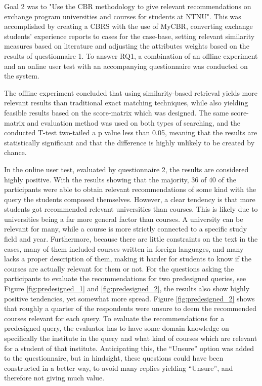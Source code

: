 Goal 2 was to "Use the CBR methodology to give relevant recommendations on exchange program universities and courses for students at NTNU". This was accomplished by creating a CBRS with the use of MyCBR, converting exchange students' experience reports to cases for the case-base, setting relevant similarity measures based on literature and adjusting the attributes weights based on the results of questionnaire 1. To answer RQ1, a combination of an offline experiment and an online user test with an accompanying questionnaire was conducted on the system. 

The offline experiment concluded that using similarity-based retrieval yields more relevant results than traditional exact matching techniques, while also yielding feasible results based on the score-matrix which was designed. The same score-matrix and evaluation method was used on both types of searching, and the conducted T-test two-tailed a p value less than 0.05, meaning that the results are statistically significant and that the difference is highly unlikely to be created by chance.

In the online user test, evaluated by questionnaire 2, the results are considered highly positive. With the results showing that the majority, 36 of 40 of the participants were able to obtain relevant recommendations of some kind with the query the students composed themselves. However, a clear tendency is that more students got recommended relevant universities than courses. This is likely due to universities being a far more general factor than courses. A university can be relevant for many, while a course is more strictly connected to a specific study field and year. Furthermore, because there are little constraints on the text in the cases, many of them included courses written in foreign languages, and many lacks a proper description of them, making it harder for students to know if the courses are actually relevant for them or not. For the questions asking the participants to evaluate the recommendations for two predesigned queries, see Figure \ref{fig:predesigned_1} and \ref{fig:predesigned_2}, the results also show highly positive tendencies, yet somewhat more spread. Figure \ref{fig:predesigned_2} shows that roughly a quarter of the respondents were unsure to deem the recommended courses relevant for each query. To evaluate the recommendations for a predesigned query, the evaluator has to have some domain knowledge on specifically the institute in the query and what kind of courses which are relevant for a student of that institute. Anticipating this, the \enquote{Unsure} option was added to the questionnaire, but in hindsight, these questions could have been constructed in a better way, to avoid many replies yielding \enquote{Unsure}, and therefore not giving much value. 

